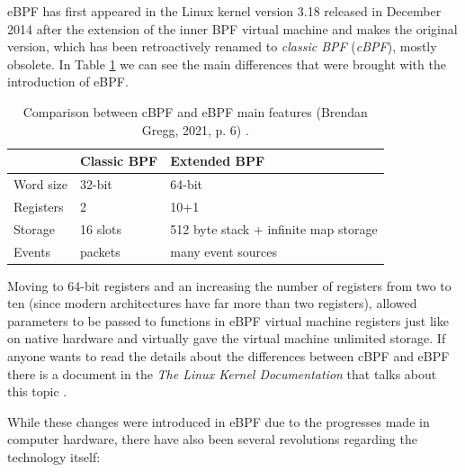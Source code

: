 eBPF has first appeared in the Linux kernel version 3.18 released in December 2014 after the extension of the inner BPF virtual machine and makes the original version, which has been retroactively renamed to \textit{classic BPF} (\textit{cBPF}), mostly obsolete.
In Table \ref{table:cBPF_vs_eBPF} we can see the main differences that were brought with the introduction of eBPF.

\begin{table}[h]
	\centering
	\begin{tabular}{|| l | l | l ||} 
		\hline
		& Classic BPF & Extended BPF \\
		\hline
		\hline
		Word size & 32-bit & 64-bit \\
		\hline
		Registers & 2 & 10+1 \\
		\hline
		Storage & 16 slots & 512 byte stack + infinite map storage \\	
		\hline
		Events & packets & many event sources \\
		\hline
	\end{tabular}
	\caption{Comparison between cBPF and eBPF main features (Brendan Gregg, 2021, p. 6) \cite{BGSlides}.}
	\label{table:cBPF_vs_eBPF}
\end{table}

Moving to 64-bit registers and an increasing the number of registers from two to ten (since modern architectures have far more than two registers), allowed parameters to be passed to functions in eBPF virtual machine registers just like on native hardware and virtually gave the virtual machine unlimited storage.
If anyone wants to read the details about the differences between cBPF and eBPF there is a document in the \textit{The Linux Kernel Documentation} that talks about this topic \cite{cBPFvseBPF}.

While these changes were introduced in eBPF due to the progresses made in computer hardware, there have also been several revolutions regarding the technology itself:

